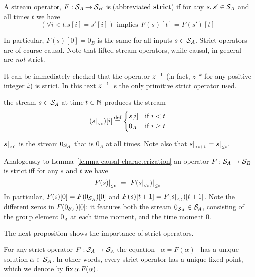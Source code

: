 \begin{definition}[Strictness]
A stream operator, $F:\mathcal{S}_{A}\to\mathcal{S}_{B}$
is  (abbreviated \textbf{strict})
if for any $s,s'\in\mathcal{S}_{A}$ and all times $t$ we have
$$
(\forall i<t . s[i]=s'[i]) ~~\text{implies}~~ F(s)[t]=F(s')[t]
$$
\end{definition}

In particular, $F(s)[0] = 0_B$ is the same for all inputs $s \in \mathcal{S}_{A}$.
Strict operators are of course causal. Note that lifted stream operators,
while causal, in general are \emph{not} strict.

It can be immediately checked that the operator $z^{-1}$
(in fact, $z^{-k}$ for any positive integer $k$)
is strict.
In this text $z^{-1}$ is the only primitive strict operator used.

\begin{definition}
 the stream $s \in \mathcal{S}_{A}$ at time $t \in \mathbb{N}$ produces the stream
$$
(s|_{_{< t}})[i] \stackrel{\textrm{\scriptsize def}}{=}  \begin{cases}
                      s[i] &\text{if}~i< t\\
                      0_A  &\text{if}~i\geq t
                      \end{cases}
$$
\end{definition}

$s|_{_{< 0}}$ is the stream $0_{\mathcal{S}_{A}}$ that is $0_A$ at all times.
Note also that $s|_{_{< t+1}} =s|_{_{\leq t}}$.


Analogously to Lemma~\ref{lemma-causal-characterization} an operator $F: \mathcal{S}_{A} \to \mathcal{S}_{B}$ is strict iff for any $s$ and $t$ we have
$$
F(s)|_{_{\leq t}} ~=~ F(s|_{_{< t}})|_{_{\leq t}}
$$
In particular, $F(s)[0] = F(0_{\mathcal{S}_{A}})[0]$ and
$F(s)[t+1]=F(s|_{_{\leq t}})[t+1]$.  Note the different zeros in $F(0_{\mathcal{S}_{A}})[0]$:
it features both the stream $0_{\mathcal{S}_{A}} \in \mathcal{S}_{A}$, consisting of the group element $0_A$
at each time moment, and the time moment $0$.

The next proposition shows the importance of strict operators.
\begin{proposition}
\label{prop-unique-fix}
For any strict operator $F: \mathcal{S}_{A} \to \mathcal{S}_{A}$ the equation ~$\alpha=F(\alpha)$~ has a unique
solution $\alpha \in \mathcal{S}_{A}$.  In other words, every strict operator has a unique fixed point,
which we denote by $\mbox{fix}\,\alpha.F(\alpha)$.
\end{proposition}

